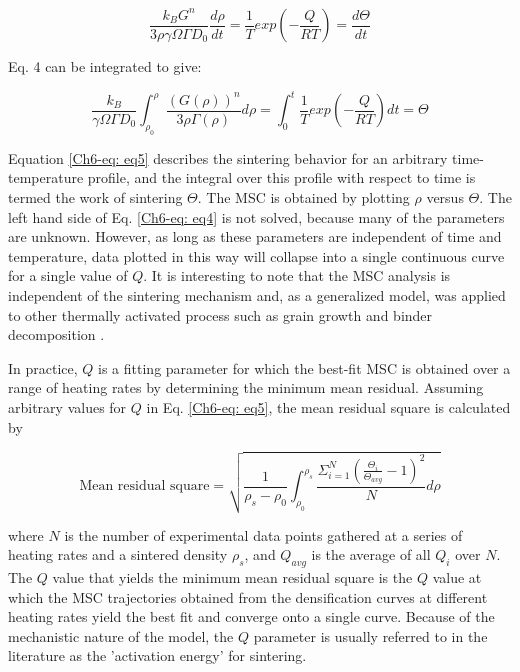 \begin{equation}
\label{Ch6-eq: eq4}
\frac{k_{B} G^{n}}{3 \rho \gamma \Omega \Gamma D_{0}} \frac{d\rho}{dt} = \frac{1}{T} exp \left( -\frac{Q}{RT} \right) = \frac{d \Theta}{dt}
\end{equation}

\noindent Eq. 4 can be integrated to give:

\begin{equation}
\label{Ch6-eq: eq5}
\frac{k_{B} }{ \gamma \Omega \Gamma D_{0}} \int_{\rho_{0}}^{\rho} \frac{(G(\rho))^{n}}{3 \rho \Gamma (\rho)} d \rho = \int_{0}^{t} \frac{1}{T} exp \left( -\frac{Q}{RT} \right) dt = \Theta
\end{equation}

\noindent Equation \ref{Ch6-eq: eq5} describes the sintering behavior for an arbitrary time-temperature profile, and the integral over this profile with respect to time is termed the work of sintering $\Theta$. The MSC is obtained by plotting $\rho$ versus $\Theta$. The left hand side of Eq. \ref{Ch6-eq: eq4} is not solved, because many of the parameters are unknown. However, as long as these parameters are independent of time and temperature, data plotted in this way will collapse into a single continuous curve for a single value of $Q$. It is interesting to note that the MSC analysis is independent of the sintering mechanism and, as a generalized model, was applied to other thermally activated process such as grain growth \cite{Park2006} and binder decomposition \cite{Diantonio2005,Aggarwal2007}.

In practice, $Q$ is a fitting parameter for which the best-fit MSC is obtained over a range of heating rates by determining the minimum mean residual. Assuming arbitrary values for $Q$ in Eq. \ref{Ch6-eq: eq5}, the mean residual square is calculated by \cite{Blaine2006}


\begin{equation}
\label{Ch6-eq: eq6}
\mbox{Mean residual square} = \sqrt{\frac{1}{\rho_{s}-\rho_{0}}\int_{\rho_{0}}^{\rho_{s}} \frac{\Sigma_{i=1}^{N} \left( \frac{\Theta_{i}}{\Theta_{avg}}-1 \right)^{2}}{N} d\rho}
\end{equation}

\noindent where $N$ is the number of experimental data points gathered at a series of heating rates and a sintered density $\rho_{s}$, and $Q_{avg}$ is the average of all $Q_{i}$ over $N$. The $Q$ value that yields the minimum mean residual square is the $Q$ value at which the MSC trajectories obtained from the densification curves at different heating rates yield the best fit and converge onto a single curve.  Because of the mechanistic nature of the model, the $Q$ parameter is usually referred to in the literature as the 'activation energy' for sintering.

